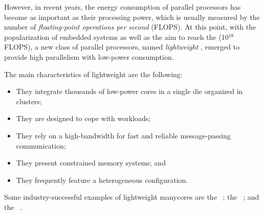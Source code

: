     However, in recent years, the energy consumption of parallel processors has become as important as their processing power, which is usually measured by the number of \textit{floating-point operations per second} (FLOPS).
    At this point, with the popularization of embedded systems as well as the aim to reach the \exascale (10$^{18}$ FLOPS), a new class of parallel processors, named \textit{lightweight} \manycores, emerged to provide high parallelism with low-power consumption.
    
    The main characteristics of  lightweight \manycores are the following:
    \begin{itemize}
        \item They integrate thousands of low-power cores in a single die organized in clusters;
        \item They are designed to cope with \mimd workloads;
        \item They rely on a high-bandwidth \noc for fast and reliable message-passing communication;
        \item They present constrained memory systems; and
        \item They frequently feature a heterogeneous configuration.
    \end{itemize}
    Some industry-successful examples of lightweight manycores are
    the \mppa~\cite{DINECHIN20131654};
    the \epiphany~\cite{olofsson2014}; and
    the \taihulight~\cite{zheng2015}.

